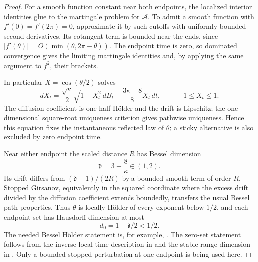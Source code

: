 \begin{proof}
For a smooth function constant near both endpoints, the localized
interior identities glue to the martingale problem for
$\mathcal A$.  To admit a smooth function with
$f'(0)=f'(2\pi)=0$, approximate it by such cutoffs with uniformly
bounded second derivatives.  Its cotangent term is bounded near the
ends, since $|f'(\theta)|=O(\min(\theta,2\pi-\theta))$.
The endpoint time is zero, so dominated convergence gives the limiting
martingale identities and, by applying the same argument to $f^2$,
their brackets.

In particular $X=\cos(\theta/2)$ solves
\begin{equation}\label{tree:jacobi}
 dX_t=\frac{\sqrt\kappa}{2}\sqrt{1-X_t^2}\,dB_t
           -\frac{3\kappa-8}{8}X_t\,dt,
 \qquad -1\le X_t\le1.
\end{equation}
The diffusion coefficient is one-half H\"older and the drift is
Lipschitz; the one-dimensional square-root uniqueness criterion gives
pathwise uniqueness.  Hence this equation fixes the instantaneous
reflected law of $\theta$; a sticky alternative is also excluded by
zero endpoint time.

Near either endpoint the scaled distance $R$ has Bessel dimension
\begin{equation}\label{tree:bessel-dimension}
 \mathfrak d=3-\frac8\kappa\in(1,2).
\end{equation}
Its drift differs from $(\mathfrak d-1)/(2R)$ by a bounded smooth
term of order $R$.  Stopped Girsanov, equivalently in the squared
coordinate where the excess drift divided by the diffusion coefficient
extends boundedly, transfers the usual Bessel path properties.  Thus
$\theta$ is locally H\"older of every exponent below $1/2$, and each
endpoint set has Hausdorff dimension at most
\begin{equation}\label{tree:zero-dimension}
 d_0=1-\mathfrak d/2<1/2.
\end{equation}
The needed Bessel H\"older statement is, for example,
\citet[Theorem~1.2 and Corollary~2.14]{HutzenthalerJentzenNoll2014}.
The zero-set statement follows from the inverse-local-time description
in \citet[Section~2.2, p.~21]{Bertoin1999Subordinators} and the
stable-range dimension in \citet[Corollary~5.3, p.~42]{Bertoin1999Subordinators}.  Only a bounded stopped
perturbation at one endpoint is being used here.


\end{proof}
